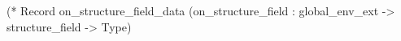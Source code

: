     (* Record on_structure_field_data (on_structure_field : global_env_ext -> structure_field -> Type)